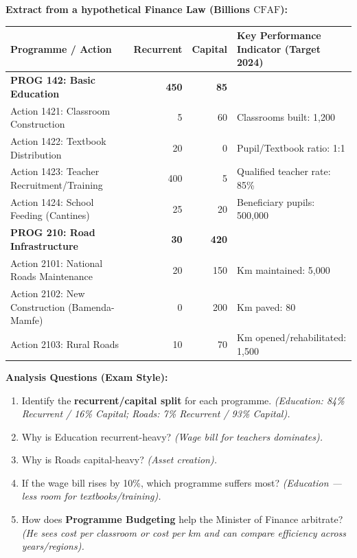 \documentclass[11pt]{article}
\begin{document}
\begin{experience}
\textbf{Extract from a hypothetical Finance Law (Billions $\mathrm{CFAF}$):}

\begin{center}
\begin{tabularx}{\linewidth}{|l|r|r|>{\centering\arraybackslash}X|}
\hline
\rowcolor{popblueL}
\textbf{Programme / Action} & \textbf{Recurrent} & \textbf{Capital} & \textbf{Key Performance Indicator (Target 2024)} \\
\hline
\textbf{PROG 142: Basic Education} & \textbf{450} & \textbf{85} & \\
\quad Action 1421: Classroom Construction & 5 & 60 & Classrooms built: 1,200 \\
\quad Action 1422: Textbook Distribution & 20 & 0 & Pupil/Textbook ratio: 1:1 \\
\quad Action 1423: Teacher Recruitment/Training & 400 & 5 & Qualified teacher rate: 85\% \\
\quad Action 1424: School Feeding (Cantines) & 25 & 20 & Beneficiary pupils: 500,000 \\
\hline
\textbf{PROG 210: Road Infrastructure} & \textbf{30} & \textbf{420} & \\
\quad Action 2101: National Roads Maintenance & 20 & 150 & Km maintained: 5,000 \\
\quad Action 2102: New Construction (Bamenda-Mamfe) & 0 & 200 & Km paved: 80 \\
\quad Action 2103: Rural Roads & 10 & 70 & Km opened/rehabilitated: 1,500 \\
\hline
\end{tabularx}
\end{center}

\textbf{Analysis Questions (Exam Style):}
\begin{enumerate}
    \item Identify the \textbf{recurrent/capital split} for each programme. \textit{(Education: 84\% Recurrent / 16\% Capital; Roads: 7\% Recurrent / 93\% Capital).}
    \item Why is Education recurrent-heavy? \textit{(Wage bill for teachers dominates).}
    \item Why is Roads capital-heavy? \textit{(Asset creation).}
    \item If the wage bill rises by 10\%, which programme suffers most? \textit{(Education — less room for textbooks/training).}
    \item How does \textbf{Programme Budgeting} help the Minister of Finance arbitrate? \textit{(He sees \emph{cost per classroom} or \emph{cost per km} and can compare efficiency across years/regions).}
\end{enumerate}
\end{experience}
\end{document}
